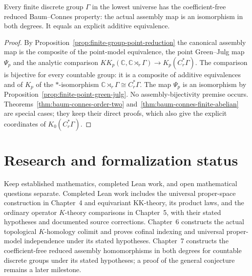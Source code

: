 \begin{theorem}\label{thm:baum-connes-finite}
\leanok
Every finite discrete group $\Gamma$ in the lowest universe has the
coefficient-free reduced Baum--Connes property: the actual assembly map is an
isomorphism in both degrees. It equals an explicit additive equivalence.
\end{theorem}
\begin{proof}
\leanok
By Proposition~\ref{prop:finite-group-point-reduction} the canonical
assembly map is the composite of the point-model equivalence, the point
Green--Julg map $\Psi_p$ and the analytic comparison
$KK_p(\mathbb C,\mathbb C\rtimes_r\Gamma)\to K_p(C^*_r\Gamma)$. The comparison
is bijective for every countable group: it is a composite of additive
equivalences and of $K_p$ of the $*$-isomorphism
$\mathbb C\rtimes_r\Gamma\cong C^*_r\Gamma$. The map $\Psi_p$ is an isomorphism
by Proposition~\ref{prop:finite-point-green-julg}. No assembly-bijectivity
premise occurs. Theorems~\ref{thm:baum-connes-order-two}
and~\ref{thm:baum-connes-finite-abelian} are special cases; they keep their
direct proofs, which also give the explicit coordinates of $K_0(C^*_r\Gamma)$.
\end{proof}

\section{Research and formalization status}
Keep established mathematics, completed Lean work, and open mathematical
questions separate. Completed Lean work includes the universal proper-space
construction in Chapter~4 and equivariant KK-theory, its product laws, and
the ordinary operator $K$-theory comparisons in Chapter~5, with their stated
hypotheses and documented source corrections. Chapter~6 constructs the actual
topological $K$-homology colimit and proves cofinal indexing and universal
proper-model independence under its stated hypotheses. Chapter~7 constructs the coefficient-free reduced assembly homomorphisms
in both degrees for countable discrete groups under its stated hypotheses;
a proof of the general conjecture remains a later milestone.

